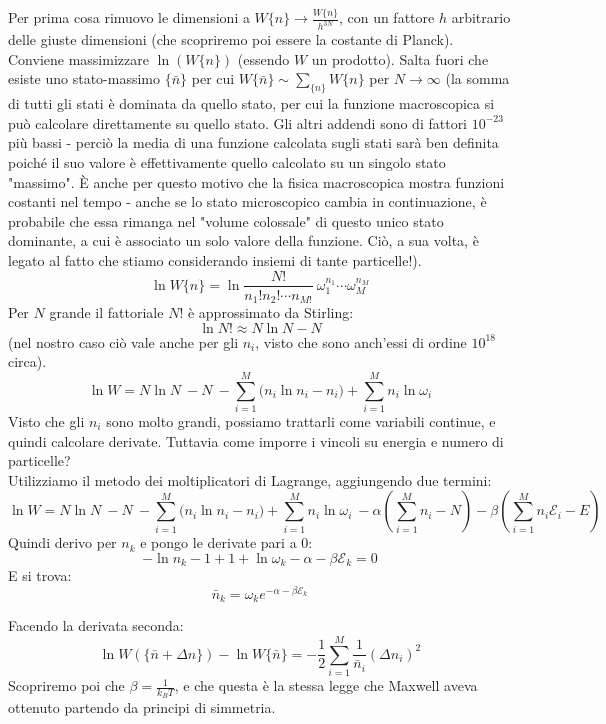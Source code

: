 \documentclass[12pt]{article}
\begin{document}
Per prima cosa rimuovo le dimensioni a $W\{n\}\rightarrow\frac{W\{n\}}{h^{3N}}$, con un fattore $h$ arbitrario delle giuste dimensioni (che scopriremo poi essere la costante di Planck).
Conviene massimizzare $\ln{\left(W\{n\}\right)}$ (essendo $W$ un prodotto). Salta fuori che esiste uno stato-massimo $\{\bar{n}\}$ per cui $W\{\bar{n}\}\sim\sum_{\{n\}} W\{n\}$  per $N\rightarrow \infty$ (la somma di tutti gli stati è dominata da quello stato, per cui la funzione macroscopica si può calcolare direttamente su quello stato. Gli altri addendi sono di fattori ${10}^{-23}$ più bassi - perciò la media di una funzione calcolata sugli stati sarà ben definita poiché il suo valore è effettivamente quello calcolato su un singolo stato "massimo". È anche per questo motivo che la fisica macroscopica mostra funzioni costanti nel tempo - anche se lo stato microscopico cambia in continuazione, è probabile che essa rimanga nel "volume colossale" di questo unico stato dominante, a cui è associato un solo valore della funzione. Ciò, a sua volta, è legato al fatto che stiamo considerando insiemi di tante particelle!).
\[
\ln{W\{n\}=\ln{\frac{N!}{n_1!n_2!\cdots n_{M!}}\ \omega_1^{n_1}\cdots\omega_M^{n_M}}}
\]
Per $N$ grande il fattoriale $N!$ è approssimato da Stirling:
\[
\ln{N!\approx N\ln{N}-N}
\]
(nel nostro caso ciò vale anche per gli $n_i$, visto che sono anch'essi di ordine ${10}^{18}$  circa).
\[
\ln{W=N\ln{N\ -N\ -\sum_{i=1}^{M}{(n_i\ln{n_i-n_i)}}}+\sum_{i=1}^{M}{n_i\ln{\omega_i}}}
\]
Visto che gli $n_i$ sono molto grandi, possiamo trattarli come variabili continue, e quindi calcolare derivate. Tuttavia come imporre i vincoli su energia e numero di particelle?\\
Utilizziamo il metodo dei moltiplicatori di Lagrange, aggiungendo due termini: 
\[
\ln{W=N\ln{N\ -N\ -\sum_{i=1}^{M}{(n_i\ln{n_i-n_i)}}}+\sum_{i=1}^{M}{n_i\ln{\omega_i}}\ -\alpha\left(\sum_{i=1}^{M}{n_i-N}\right)-\beta\left(\sum_{i=1}^{M}{n_i\mathcal{E}_i-E}\right)}
\]
Quindi derivo per $n_k$ e pongo le derivate pari a $0$:
\[
-\ln{n_k-1+1+\ln{\omega_k-\alpha-\beta\mathcal{E}_k=0}}
\]
E si trova:
\[
{\bar{n}}_k= \omega_ke^{-\alpha-\beta\mathcal{E}_k}
\]

Facendo la derivata seconda:
\[
\ln{W\left(\{\bar{n}+\Delta n\}\right)-\ln{W\{\bar{n}\}=-\frac{1}{2}}}\sum_{i=1}^{M}{\frac{1}{{\bar{n}}_i}\left(\Delta n_i\right)^2}
\]
Scopriremo poi che $\beta=\frac{1}{k_BT}$, e che questa è la stessa legge che Maxwell aveva ottenuto partendo da principi di simmetria.

\end{document}
